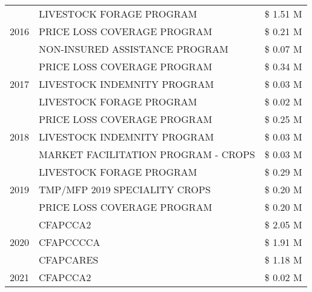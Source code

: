 \begin{tabular}{llr}
\multirow[t]{3}{*}{2016} & LIVESTOCK FORAGE PROGRAM & \$ 1.51 M \\
 & PRICE LOSS COVERAGE PROGRAM & \$ 0.21 M \\
 & NON-INSURED ASSISTANCE PROGRAM & \$ 0.07 M \\
\cline{1-3}
\multirow[t]{3}{*}{2017} & PRICE LOSS COVERAGE PROGRAM & \$ 0.34 M \\
 & LIVESTOCK INDEMNITY PROGRAM & \$ 0.03 M \\
 & LIVESTOCK FORAGE PROGRAM & \$ 0.02 M \\
\cline{1-3}
\multirow[t]{3}{*}{2018} & PRICE LOSS COVERAGE PROGRAM & \$ 0.25 M \\
 & LIVESTOCK INDEMNITY PROGRAM & \$ 0.03 M \\
 & MARKET FACILITATION PROGRAM - CROPS & \$ 0.03 M \\
\cline{1-3}
\multirow[t]{3}{*}{2019} & LIVESTOCK FORAGE PROGRAM & \$ 0.29 M \\
 & TMP/MFP 2019 SPECIALITY CROPS & \$ 0.20 M \\
 & PRICE LOSS COVERAGE PROGRAM & \$ 0.20 M \\
\cline{1-3}
\multirow[t]{3}{*}{2020} & CFAPCCA2 & \$ 2.05 M \\
 & CFAPCCCCA & \$ 1.91 M \\
 & CFAPCARES & \$ 1.18 M \\
\cline{1-3}
2021 & CFAPCCA2 & \$ 0.02 M \\
\cline{1-3}
\bottomrule
\end{tabular}
